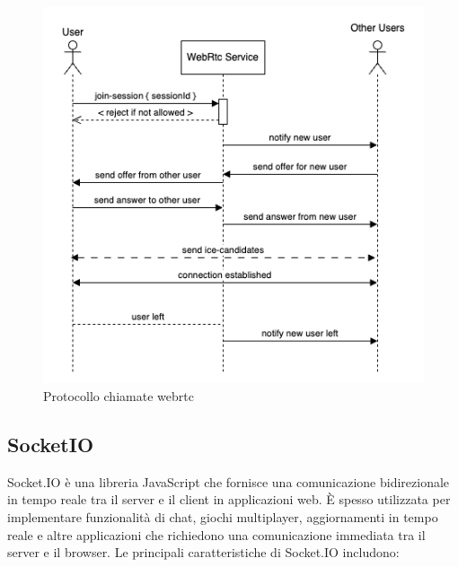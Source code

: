 \begin{figure}[htbp]
    \centering
    \includegraphics[width=\textwidth]{img/piperchat-WebRTC.drawio.png}
    \caption{Protocollo chiamate webrtc}
    \label{fig:webrtc-protocol}
\end{figure}

%
%
%
\subsection{SocketIO}

Socket.IO è una libreria JavaScript che fornisce una comunicazione bidirezionale in tempo reale tra il server e il client in applicazioni web.
%
È spesso utilizzata per implementare funzionalità di chat, giochi multiplayer, aggiornamenti in tempo reale e altre applicazioni che richiedono una comunicazione immediata tra il server e il browser.
%
Le principali caratteristiche di Socket.IO includono:

